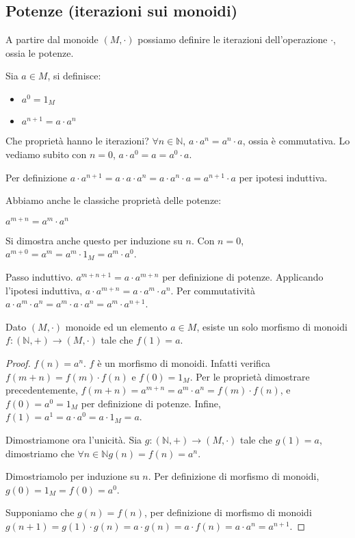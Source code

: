 \subsection{Potenze (iterazioni sui monoidi)}

A partire dal monoide $(M, \cdot)$ possiamo definire le iterazioni dell'operazione $\cdot$, ossia le potenze.

Sia $ a \in M$, si definisce:
\begin{itemize}
    \item $a^0 = 1_M$
    \item $a^{n+1} = a \cdot a^{n}$
\end{itemize}
Che propriet\`a hanno le iterazioni? $\forall n \in \mathbb{N}$, $a \cdot a^n = a^n \cdot a$, ossia \`e commutativa. Lo vediamo subito con $n = 0$, $a \cdot a^0 = a = a^0 \cdot a$.

Per definizione $a \cdot a^{n+1} = a \cdot a \cdot a^{n} = a \cdot a^n \cdot a = a^{n+1} \cdot a$ per ipotesi induttiva.

Abbiamo anche le classiche propriet\`a delle potenze:

$a^{m + n} = a^m \cdot a^n$

Si dimostra anche questo per induzione su $n$. Con $n = 0$, $a^{m+0} = a^m = a^m \cdot 1_M = a^m \cdot a^0$.

Passo induttivo. $a^{m + n + 1} = a \cdot a^{m + n}$ per definizione di potenze. Applicando l'ipotesi induttiva, $a \cdot a^{m + n} = a \cdot a^m \cdot a^n$. Per commutativit\`a $a \cdot a^m \cdot a^n = a^m \cdot a \cdot a^n = a^m \cdot a^{n+1}$.

\begin{theorem}
Dato $(M, \cdot)$ monoide ed un elemento $a \in M$, esiste un solo morfismo di monoidi $f : (\mathbb{N}, +) \to (M, \cdot)$ tale che $f(1) = a$.
\end{theorem}
\begin{proof}
$f(n) = a^n$. $f$ \`e un morfismo di monoidi. Infatti verifica $f(m+n) = f(m) \cdot f(n)$ e $f(0) = 1_M$. Per le propriet\`a dimostrare precedentemente, $f(m+ n) = a^{m+n} = a^m \cdot a^n = f(m) \cdot f(n)$, e $f(0) = a^0 = 1_M$ per definizione di potenze. Infine, $f(1) = a^1 = a \cdot a^0 = a \cdot 1_M = a$.

Dimostriamone ora l'unicit\`a. Sia $g : (\mathbb{N}, +) \to (M, \cdot )$ tale che $g(1) = a$, dimostriamo che $\forall n \in \mathbb{N} g(n) = f(n) = a^n$.

Dimostriamolo per induzione su $n$. Per definizione di morfismo di monoidi, $g(0) = 1_M = f(0) = a^0$.

Supponiamo che $g(n) = f(n)$, per definizione di morfismo di monoidi $g(n+1) = g(1) \cdot g(n) = a \cdot g(n) = a \cdot f(n) = a \cdot a^n = a^{n+1}$.
\end{proof}

